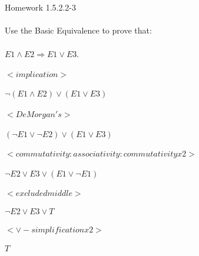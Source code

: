 \documentclass[11pt]{article}
\begin{document}
\\
\\
\\
\\
\\
\\
\\
\\
\\
\\
\\
\\
\\
\\
\\
\\
\\
\\
\\
Homework 1.5.2.2-3
\\
\\
Use the Basic Equivalence to prove that:
\\
\\
$E1 \land E2 \Rightarrow E1 \vee E3$.
\\
\\
$<implication>$
\\
\\
$\neg(E1 \land E2) \vee (E1 \vee E3)$
\\
\\
$<DeMorgan's>$
\\
\\
$(\neg E1 \vee \neg E2) \vee (E1 \vee E3)$
\\
\\
$<commutativity: associativity:commutativity x 2>$
\\
\\
$\neg E2 \vee E3 \vee (E1 \vee \neg E1)$
\\
\\
$<excluded middle>$
\\
\\
$\neg E2 \vee E3 \vee T$
\\
\\
$< \vee - simplification x 2>$
\\
\\
$T$
\\
\\
\\
\\
\\
\\
\\
\\
\\
\end{document}
